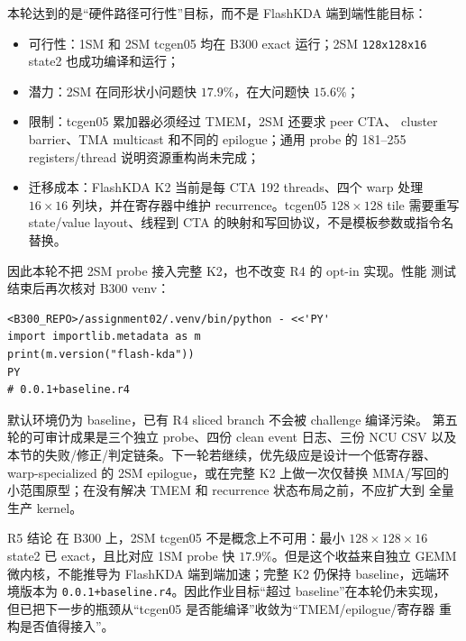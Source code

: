 \documentclass[11pt,a4paper,fontset=none]{ctexart}
\newcommand{\code}[1]{\texttt{#1}}
\begin{document}
本轮达到的是“硬件路径可行性”目标，而不是 FlashKDA 端到端性能目标：

\begin{itemize}
\item 可行性：1SM 和 2SM tcgen05 均在 B300 exact 运行；2SM
      \code{128x128x16} state2 也成功编译和运行；
\item 潜力：2SM 在同形状小问题快 \(17.9\%\)，在大问题快 \(15.6\%\)；
\item 限制：tcgen05 累加器必须经过 TMEM，2SM 还要求 peer CTA、
      cluster barrier、TMA multicast 和不同的 epilogue；通用 probe
      的 181--255 registers/thread 说明资源重构尚未完成；
\item 迁移成本：FlashKDA K2 当前是每 CTA 192 threads、四个 warp 处理
      \(16\times16\) 列块，并在寄存器中维护 recurrence。tcgen05
      \(128\times128\) tile 需要重写 state/value layout、线程到 CTA
      的映射和写回协议，不是模板参数或指令名替换。
\end{itemize}

因此本轮不把 2SM probe 接入完整 K2，也不改变 R4 的 opt-in 实现。性能
测试结束后再次核对 B300 venv：

\begin{lstlisting}
<B300_REPO>/assignment02/.venv/bin/python - <<'PY'
import importlib.metadata as m
print(m.version("flash-kda"))
PY
# 0.0.1+baseline.r4
\end{lstlisting}

默认环境仍为 baseline，已有 R4 sliced branch 不会被 challenge 编译污染。
第五轮的可审计成果是三个独立 probe、四份 clean event 日志、三份 NCU CSV
以及本节的失败/修正/判定链条。下一轮若继续，优先级应是设计一个低寄存器、
warp-specialized 的 2SM epilogue，或在完整 K2 上做一次仅替换 MMA/写回的
小范围原型；在没有解决 TMEM 和 recurrence 状态布局之前，不应扩大到
全量生产 kernel。

\begin{record}{R5 结论}
在 B300 上，2SM tcgen05 不是概念上不可用：最小
\(128\times128\times16\) state2 已 exact，且比对应 1SM probe 快
\(17.9\%\)。但是这个收益来自独立 GEMM 微内核，不能推导为 FlashKDA
端到端加速；完整 K2 仍保持 baseline，远端环境版本为
\code{0.0.1+baseline.r4}。因此作业目标“超过 baseline”在本轮仍未实现，
但已把下一步的瓶颈从“tcgen05 是否能编译”收敛为“TMEM/epilogue/寄存器
重构是否值得接入”。\end{record}


















\end{document}
